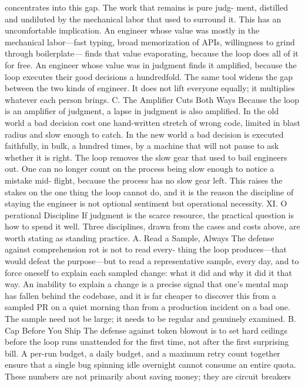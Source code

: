 \documentclass[conference]{IEEEtran}
\begin{document}
concentrates into this gap. The work that remains is pure judg-
ment, distilled and undiluted by the mechanical labor that used
to surround it.
This has an uncomfortable implication. An engineer whose
value was mostly in the mechanical labor—fast typing, broad
memorization of APIs, willingness to grind through boilerplate—
finds that value evaporating, because the loop does all of it for
free. An engineer whose value was in judgment finds it amplified,
because the loop executes their good decisions a hundredfold.
The same tool widens the gap between the two kinds of engineer.
It does not lift everyone equally; it multiplies whatever each
person brings.
C. The Amplifier Cuts Both Ways
Because the loop is an amplifier of judgment, a lapse in
judgment is also amplified. In the old world a bad decision cost
one hand-written stretch of wrong code, limited in blast radius
and slow enough to catch. In the new world a bad decision is
executed faithfully, in bulk, a hundred times, by a machine that
will not pause to ask whether it is right. The loop removes the
slow gear that used to bail engineers out. One can no longer
count on the process being slow enough to notice a mistake mid-
flight, because the process has no slow gear left. This raises the
stakes on the one thing the loop cannot do, and it is the reason
the discipline of staying the engineer is not optional sentiment
but operational necessity.
XI. O perational Discipline
If judgment is the scarce resource, the practical question is
how to spend it well. Three disciplines, drawn from the cases
and costs above, are worth stating as standing practice.
A. Read a Sample, Always
The defense against comprehension rot is not to read every-
thing the loop produces—that would defeat the purpose—but
to read a representative sample, every day, and to force oneself
to explain each sampled change: what it did and why it did it
that way. An inability to explain a change is a precise signal that
one’s mental map has fallen behind the codebase, and it is far
cheaper to discover this from a sampled PR on a quiet morning
than from a production incident on a bad one. The sample need
not be large; it needs to be regular and genuinely examined.
B. Cap Before You Ship
The defense against token blowout is to set hard ceilings
before the loop runs unattended for the first time, not after the
first surprising bill. A per-run budget, a daily budget, and a
maximum retry count together ensure that a single bug spinning
idle overnight cannot consume an entire quota. These numbers
are not primarily about saving money; they are circuit breakers
\end{document}
